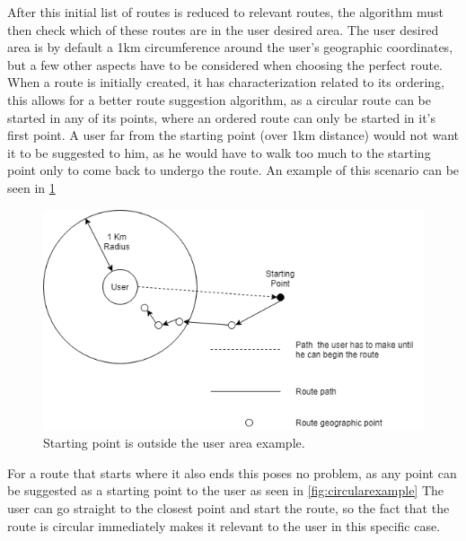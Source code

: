    After this initial list of routes is reduced to relevant routes, the algorithm must then check which of these routes are in the user desired area.
    The user desired area is by default a 1km circumference around the user's geographic coordinates, but a few other aspects have to be considered
    when choosing the perfect route. When a route is initially created, it has characterization related to its ordering, this allows for a better route suggestion
    algorithm, as a circular route can be started in any of its points, where an ordered route can only be started in it's first point. A user far from the starting
    point (over 1km distance) would not want it to be suggested to him, as he would have to walk too much to the starting point only to come back to undergo the route.
    An example of this scenario can be seen in \ref{fig:startingpoint}
    
    \begin{figure}[H]            
        \includegraphics[width=\textwidth]{images/project-structure/starting-point.PNG}
        \caption{Starting point is outside the user area example.}
        \label{fig:startingpoint}
    \end{figure}   

    For a route that starts where it also ends this poses no problem, as any point can be suggested as a starting point to the user as seen in \ref{fig:circularexample}
    The user can go straight to the closest point and start the route, so the fact that the route is circular immediately makes it relevant to the user in this
    specific case.

